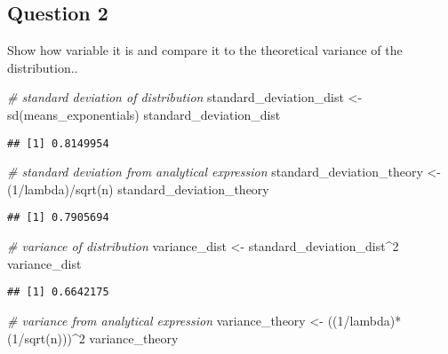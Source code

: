 \documentclass[
]{article}
\newenvironment{Shaded}{\begin{snugshade}}{\end{snugshade}}
\newcommand{\CommentTok}[1]{\textcolor[rgb]{0.56,0.35,0.01}{\textit{#1}}}
\newcommand{\DecValTok}[1]{\textcolor[rgb]{0.00,0.00,0.81}{#1}}
\newcommand{\FunctionTok}[1]{\textcolor[rgb]{0.00,0.00,0.00}{#1}}
\newcommand{\NormalTok}[1]{#1}
\newcommand{\OtherTok}[1]{\textcolor[rgb]{0.56,0.35,0.01}{#1}}
\newcommand{\SpecialCharTok}[1]{\textcolor[rgb]{0.00,0.00,0.00}{#1}}
\begin{document}
\hypertarget{question-2}{%
\subsection{Question 2}\label{question-2}}

Show how variable it is and compare it to the theoretical variance of
the distribution..

\begin{Shaded}
\begin{Highlighting}[]
\CommentTok{\# standard deviation of distribution}
\NormalTok{standard\_deviation\_dist }\OtherTok{\textless{}{-}} \FunctionTok{sd}\NormalTok{(means\_exponentials)}
\NormalTok{standard\_deviation\_dist}
\end{Highlighting}
\end{Shaded}

\begin{verbatim}
## [1] 0.8149954
\end{verbatim}

\begin{Shaded}
\begin{Highlighting}[]
\CommentTok{\# standard deviation from analytical expression}
\NormalTok{standard\_deviation\_theory }\OtherTok{\textless{}{-}}\NormalTok{ (}\DecValTok{1}\SpecialCharTok{/}\NormalTok{lambda)}\SpecialCharTok{/}\FunctionTok{sqrt}\NormalTok{(n)}
\NormalTok{standard\_deviation\_theory}
\end{Highlighting}
\end{Shaded}

\begin{verbatim}
## [1] 0.7905694
\end{verbatim}

\begin{Shaded}
\begin{Highlighting}[]
\CommentTok{\# variance of distribution}
\NormalTok{variance\_dist }\OtherTok{\textless{}{-}}\NormalTok{ standard\_deviation\_dist}\SpecialCharTok{\^{}}\DecValTok{2}
\NormalTok{variance\_dist}
\end{Highlighting}
\end{Shaded}

\begin{verbatim}
## [1] 0.6642175
\end{verbatim}

\begin{Shaded}
\begin{Highlighting}[]
\CommentTok{\# variance from analytical expression}
\NormalTok{variance\_theory }\OtherTok{\textless{}{-}}\NormalTok{ ((}\DecValTok{1}\SpecialCharTok{/}\NormalTok{lambda)}\SpecialCharTok{*}\NormalTok{(}\DecValTok{1}\SpecialCharTok{/}\FunctionTok{sqrt}\NormalTok{(n)))}\SpecialCharTok{\^{}}\DecValTok{2}
\NormalTok{variance\_theory}
\end{Highlighting}
\end{Shaded}
\end{document}
